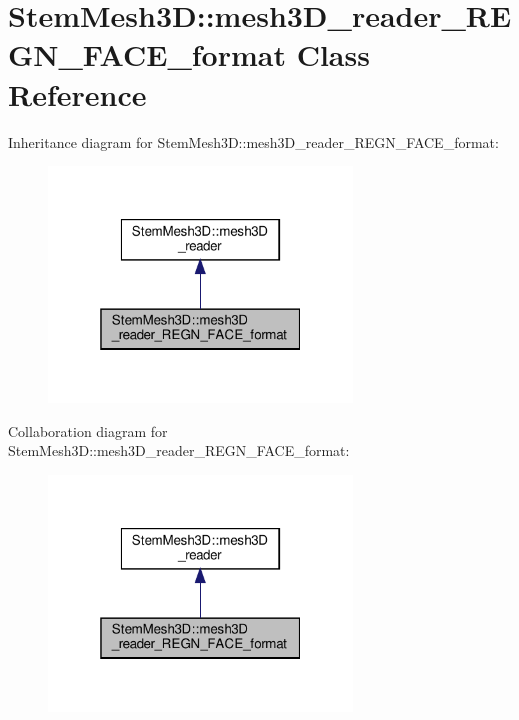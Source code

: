 \hypertarget{classStemMesh3D_1_1mesh3D__reader__REGN__FACE__format}{}\section{Stem\+Mesh3D\+:\+:mesh3\+D\+\_\+reader\+\_\+\+R\+E\+G\+N\+\_\+\+F\+A\+C\+E\+\_\+format Class Reference}
\label{classStemMesh3D_1_1mesh3D__reader__REGN__FACE__format}


Inheritance diagram for Stem\+Mesh3D\+:\+:mesh3\+D\+\_\+reader\+\_\+\+R\+E\+G\+N\+\_\+\+F\+A\+C\+E\+\_\+format\+:\nopagebreak
\begin{figure}[H]
\begin{center}
\leavevmode
\includegraphics[width=229pt]{classStemMesh3D_1_1mesh3D__reader__REGN__FACE__format__inherit__graph}
\end{center}
\end{figure}


Collaboration diagram for Stem\+Mesh3D\+:\+:mesh3\+D\+\_\+reader\+\_\+\+R\+E\+G\+N\+\_\+\+F\+A\+C\+E\+\_\+format\+:\nopagebreak
\begin{figure}[H]
\begin{center}
\leavevmode
\includegraphics[width=229pt]{classStemMesh3D_1_1mesh3D__reader__REGN__FACE__format__coll__graph}
\end{center}
\end{figure}
